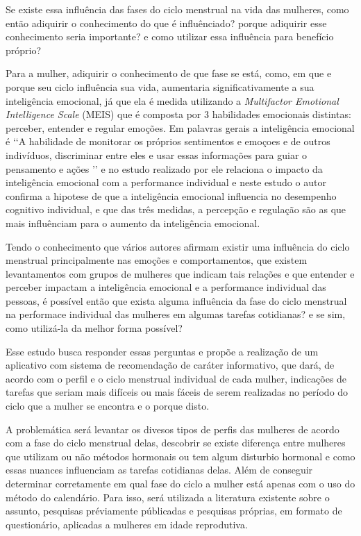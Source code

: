 Se existe essa influência das fases do ciclo menstrual na vida das mulheres, como então adiquirir o conhecimento do que é influênciado? porque adiquirir esse conhecimento seria importante? e como utilizar essa influência para benefício próprio?

Para a mulher, adiquirir o conhecimento de que fase se está, como, em que e porque seu ciclo influência sua vida, aumentaria significativamente a sua inteligência emocional, já que ela é medida utilizando a \textit{Multifactor Emotional Intelligence Scale} (MEIS) que é composta por 3 habilidades emocionais distintas: perceber, entender e regular emoções. Em palavras gerais a inteligência emocional é \lq \lq A habilidade de monitorar os próprios sentimentos e emoçoes e de outros indivíduos, discriminar entre eles e usar essas informações para guiar o pensamento e ações \rq \rq \cite{salovey1990} e no estudo realizado por  ele relaciona o impacto da inteligência emocional com a performance individual e neste estudo o autor confirma a hipotese de que a inteligência emocional influencia no desempenho cognitivo individual, e que das três medidas, a percepção e regulação são as que mais influênciam para o aumento da inteligência emocional.
  

Tendo o conhecimento que vários autores afirmam existir uma influência do ciclo menstrual principalmente nas emoções e comportamentos, que existem levantamentos com grupos de mulheres que indicam tais relações e que entender e perceber impactam a inteligência emocional e a performance individual das pessoas, é possível então que exista alguma influência da fase do ciclo menstrual na performace individual das mulheres em algumas tarefas cotidianas? e se sim, como utilizá-la da melhor forma possível? 

Esse estudo busca responder essas perguntas e propõe a realização de um aplicativo com  sistema de recomendação de caráter informativo, que dará, de acordo com o perfil e o ciclo menstrual individual de cada mulher, indicações de tarefas que seriam mais difíceis ou mais fáceis de serem realizadas no período do ciclo que a mulher se encontra e o porque disto.
 
A problemática será levantar os divesos tipos de perfis das mulheres de acordo com a fase do ciclo menstrual delas, descobrir se existe diferença entre mulheres que utilizam ou não métodos hormonais ou tem algum disturbio hormonal e como essas nuances influenciam as tarefas cotidianas delas. Além de conseguir determinar corretamente em qual fase do ciclo a mulher está apenas com o uso do método do calendário. Para isso, será utilizada a literatura existente sobre o assunto, pesquisas préviamente públicadas e pesquisas próprias, em formato de questionário, aplicadas a mulheres em idade reprodutiva.

